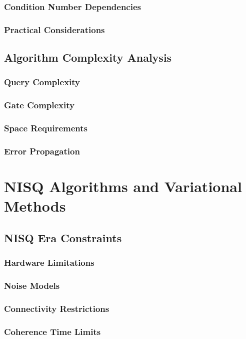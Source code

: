 \documentclass[12pt,a4paper]{book}
\begin{document}
\subsection{Condition Number Dependencies}
\subsection{Practical Considerations}

\section{Algorithm Complexity Analysis}
\subsection{Query Complexity}
\subsection{Gate Complexity}
\subsection{Space Requirements}
\subsection{Error Propagation}

\chapter{NISQ Algorithms and Variational Methods}

\section{NISQ Era Constraints}
\subsection{Hardware Limitations}
\subsection{Noise Models}
\subsection{Connectivity Restrictions}
\subsection{Coherence Time Limits}
\end{document}
